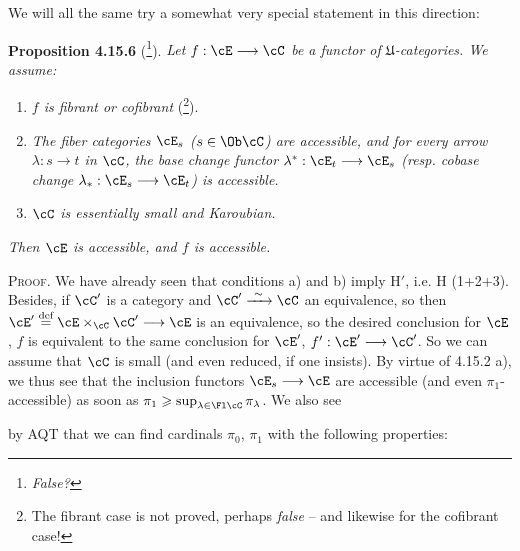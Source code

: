 We will all the same try a somewhat very special statement in this direction:

\textbf{Proposition 4.15.6} (\footnote[180]{\textit{False?}}). \textit{Let $f : \cE \longrightarrow \cC$ be a functor of $\mathfrak{U}$-categories. We assume:}
\begin{enumerate}
\item[\textit{a)}] \textit{$f$ is fibrant or cofibrant} (\footnote[181]{The fibrant case is not proved, perhaps \textit{false} -- and likewise for the cofibrant case!}).
\item[\textit{b)}] \textit{The fiber categories $\cE_s$ ($s \in \Ob \cC$) are accessible, and for every arrow $\lambda : s \longrightarrow t$ in $\cC$, the base change functor $\lambda^* : \cE_t \longrightarrow \cE_s$ (resp. cobase change $\lambda_* : \cE_s \longrightarrow \cE_t$) is accessible.}
\item[\textit{c)}] \textit{$\cC$ is essentially small and Karoubian.}
\end{enumerate}
\textit{Then $\cE$ is accessible, and $f$ is accessible.}

\textsc{Proof}. We have already seen that conditions a) and b) imply $\mathrm{H}'$, i.e. H (1+2+3). Besides, if $\cC'$ is a category and $\cC' \xrightarrow{\ \sim\ } \cC$ an equivalence, so then $\cE' \overset{\text{def}}{=} \cE \times_{\cC} \cC' \longrightarrow \cE$ is an equivalence, so the desired conclusion for $\cE$, $f$ is equivalent to the same conclusion for $\cE'$, $f' : \cE' \longrightarrow \cC'$. So we can assume that $\cC$ is small (and even reduced, if one insists). By virtue of 4.15.2 a), we thus see that the inclusion functors $\cE_s \longrightarrow \cE$ are accessible (and even $\pi_1$-accessible) as soon as $\pi_1 \geqslant \sup_{\lambda \in \Fl \cC} \pi_{\lambda}$. We also see

by AQT that we can find cardinals $\pi_0$, $\pi_1$ with the following properties:

